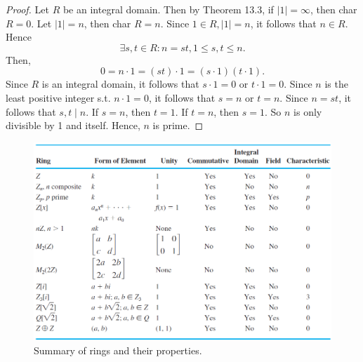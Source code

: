 \documentclass{article}
\theoremstyle{definition}
\begin{document}
\begin{proof}
     Let $R$ be an integral domain. Then by Theorem 13.3, if $|1|=\infty$, then char $R=0$. Let $|1|=n$, then char $R=n$. Since $1\in R, |1|=n$, it follows that $n\in R$. Hence 
     \begin{equation*}
         \exists s,t \in R: n=st, 1\leq s,t \leq n.
     \end{equation*}
     Then,
     \begin{equation*}
         0=n\cdot1=(st)\cdot1=(s\cdot1)(t\cdot1).
     \end{equation*}
     Since $R$ is an integral domain, it follows that $s\cdot1=0$ or $t\cdot1=0$. Since $n$ is the least positive integer s.t. $n\cdot1=0$, it follows that $s=n$ or $t=n$. Since $n=st$, it follows that $s,t\mid n$. If $s=n$, then $t=1$. If $t=n$, then $s=1$. So $n$ is only divisible by 1 and itself. Hence, $n$ is prime.
\end{proof}

\begin{figure}[!htbp]
    \centering
    \includegraphics[width=\linewidth]{figures/ring-summary.png}
    \caption{Summary of rings and their properties.}
    \label{ring-summary}
\end{figure}
\end{document}
